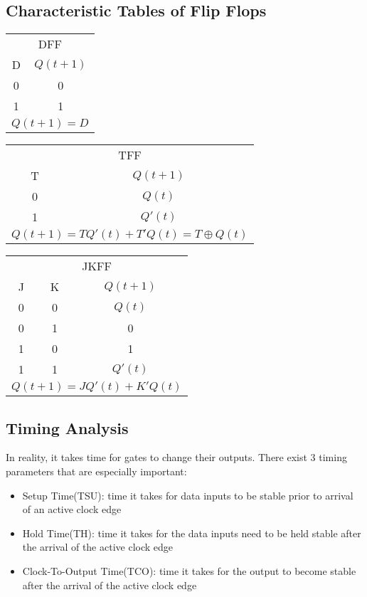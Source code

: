 \documentclass[12pt]{report}
\begin{document}
		\subsection{Characteristic Tables of Flip Flops}
			\begin{tabular}{ c | c }
				\multicolumn{2}{c}{DFF}\\
				D & $Q(t+1)$\\
				\hline
				0 & 0 \\
				1 & 1 \\
				\multicolumn{2}{c}{$Q(t+1) = D$}
			\end{tabular}
			\vline \hfill
			\begin{tabular}{ c | c }
				\multicolumn{2}{c}{TFF}\\
				T & $Q(t+1)$\\
				\hline
				0 & $Q(t)$ \\
				1 & $Q'(t)$ \\
				\multicolumn{2}{c}{$Q(t+1) = TQ'(t) + T'Q(t) = T \oplus Q(t)$}
			\end{tabular}
			\vline \hfill
			\begin{tabular}{ c | c | c }
				\multicolumn{3}{c}{JKFF}\\
				J & K & $Q(t+1)$\\
				\hline
				0 & 0 & $Q(t)$ \\
				0 & 1 & 0 \\
				1 & 0 & 1 \\
				1 & 1 & $Q'(t)$ \\				
				\multicolumn{3}{c}{$Q(t+1) = JQ'(t) + K'Q(t)$}
			\end{tabular}									
		\subsection{Timing Analysis}
			In reality, it takes time for gates to change their outputs. There exist 3 timing parameters that are especially important:\\
			\begin{itemize}
				\item Setup Time(TSU): time it takes for data inputs to be stable prior to arrival of an active clock edge
				\item Hold Time(TH): time it takes for the data inputs need to be held stable after the arrival of the active clock edge
				\item Clock-To-Output Time(TCO): time it takes for the output to become stable after the arrival of the active clock edge
			\end{itemize}
\end{document}

